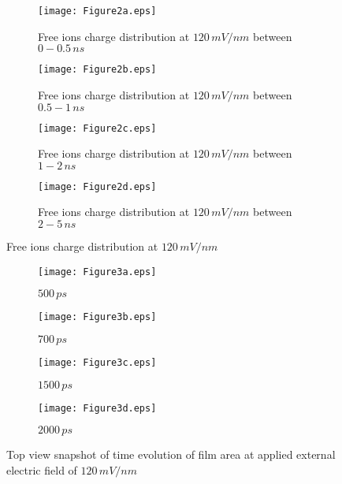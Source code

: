 \begin{figure}[h]
\centering
\begin{subfigure}{.45\textwidth}
  \centering
  \texttt{[image: Figure2a.eps]}
  \caption{Free ions charge distribution at $120\, mV/nm$ between $0 - 0.5\, ns$}
  \label{fig:120mV_0-05ns}
\end{subfigure}%
\begin{subfigure}{.45\textwidth}
  \centering
  \texttt{[image: Figure2b.eps]}
  \caption{Free ions charge distribution at $120\, mV/nm$ between $0.5 - 1\, ns$}
  \label{fig:120mV_05-1ns}
\end{subfigure}
\begin{subfigure}{.45\textwidth}
  \centering
  \texttt{[image: Figure2c.eps]}
  \caption{Free ions charge distribution at $120\, mV/nm$ between $1 - 2\, ns$}
  \label{fig:diff_120mV_1-2ns}
\end{subfigure}
\begin{subfigure}{.45\textwidth}
  \centering
  \texttt{[image: Figure2d.eps]}
  \caption{Free ions charge distribution at $120\, mV/nm$ between $2 - 5\, ns$}
  \label{fig:diff_120mV_2-5ns}
\end{subfigure}
\caption{Free ions charge distribution at $120\, mV/nm$}
\label{fig:nvt_charge_distrib_120mV}
\end{figure}

\begin{figure}[h]
\centering
\begin{subfigure}{.45\textwidth}
  \centering
  \texttt{[image: Figure3a.eps]}
  \caption{$500\, ps$}
  \label{fig:top_view_500ps}
\end{subfigure}%
\begin{subfigure}{.45\textwidth}
  \centering
  \texttt{[image: Figure3b.eps]}
  \caption{$700\, ps$}
  \label{fig:top_view_700ps}
\end{subfigure}
\begin{subfigure}{.45\textwidth}
  \centering
  \texttt{[image: Figure3c.eps]}
  \caption{$1500\, ps$}
  \label{fig:top_view_1500ps}
\end{subfigure}
\begin{subfigure}{.45\textwidth}
  \centering
  \texttt{[image: Figure3d.eps]}
  \caption{$2000\, ps$}
  \label{fig:top_view_2000ps}
\end{subfigure}
\caption{Top view snapshot of time evolution of film area at applied external electric field of $120\, mV/nm$}
\label{fig:film_rupture_nvt}
\end{figure}



